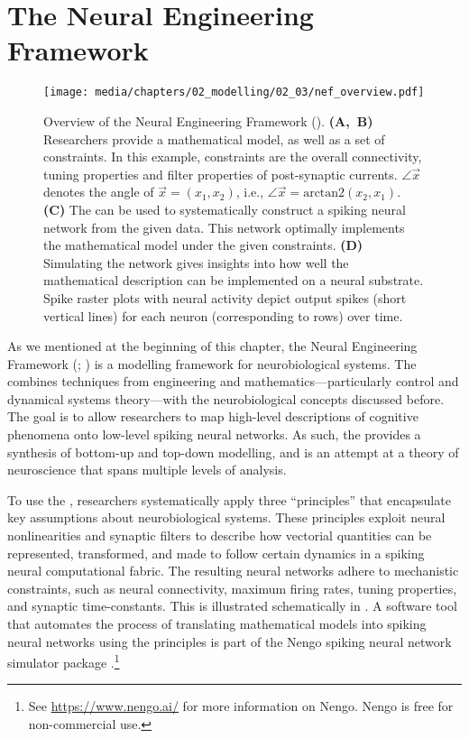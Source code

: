 
\section{The Neural Engineering Framework}
\label{sec:nef}

\begin{figure}[p]
	\texttt{[image: media/chapters/02\_modelling/02\_03/nef\_overview.pdf]}
	\caption[Overview of the Neural Engineering Framework]{Overview of the Neural Engineering Framework (\NEF).
	\textbf{(A,~B)} Researchers provide a mathematical model, as well as a set of constraints.
	In this example, constraints are the overall connectivity, tuning properties and filter properties of post-synaptic currents. $\angle \vec x$ denotes the angle of $\vec x = (x_1, x_2)$, i.e., $\angle \vec x = \mathrm{arctan2}(x_2, x_1)$. \textbf{(C)} The \NEF can be used to systematically construct a spiking neural network from the given data. This network optimally implements the mathematical model under the given constraints.
	\textbf{(D)} Simulating the network gives insights into how well the mathematical description can be implemented on a neural substrate.
	Spike raster plots with neural activity depict output spikes (short vertical lines) for each neuron (corresponding to rows) over time.}
	\label{fig:nef_overview}
\end{figure}

As we mentioned at the beginning of this chapter, the Neural Engineering Framework (\NEF; \cite{eliasmith2003neural}) is a modelling framework for neurobiological systems.
The \NEF combines techniques from engineering and mathematics---particularly control and dynamical systems theory---with the neurobiological concepts discussed before.
The goal is to allow researchers to map high-level descriptions of cognitive phenomena onto low-level spiking neural networks.
As such, the \NEF provides a synthesis of bottom-up and top-down modelling, and is an attempt at a theory of neuroscience that spans multiple levels of analysis.

To use the \NEF, researchers systematically apply three \enquote{principles} that encapsulate key assumptions about neurobiological systems.
These principles exploit neural nonlinearities and synaptic filters to describe how vectorial quantities can be represented, transformed, and made to follow certain dynamics in a spiking neural computational fabric.
The resulting neural networks adhere to mechanistic constraints, such as neural connectivity, maximum firing rates, tuning properties, and synaptic time-constants.
This is illustrated schematically in .
A software tool that automates the process of translating mathematical models into spiking neural networks using the \NEF principles is part of the Nengo spiking neural network simulator package \citep{bekolay2014nengo}.\footnote{See \url{https://www.nengo.ai/} for more information on Nengo. Nengo is free for non-commercial use.}



